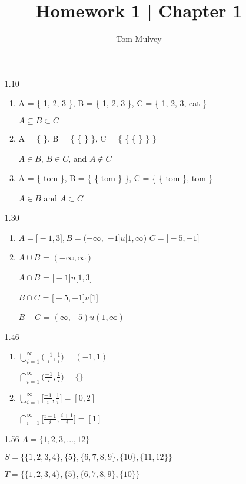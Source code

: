 \documentclass[12pt]{article}
\begin{document}
\title{Homework 1 | Chapter 1}
\author{Tom Mulvey}

\maketitle

\begin{enumerate}

\item[1.10]
\begin{enumerate}
\item
   A = \{ 1, 2, 3 \}, B = \{ 1, 2, 3 \}, C = \{ 1, 2, 3, cat \}
   
   $A\subseteq B\subset C$
\item
   A = \{ \}, B = \{ \{ \} \}, C = \{ \{ \{ \} \} \}
   
   $A\in B$, $B\in C$, and $A\notin C$
\item
   A = \{ tom \}, B = \{ \{ tom \} \}, C = \{ \{ tom \}, tom  \}

   $A\in B$ and $A\subset C$
\end{enumerate}

\item[1.30]
\begin{enumerate}
\item
   $A = \big[ -1, 3 \big], B = ( -{\infty}, $ $-1 \big]u\big[1, \infty )$ $C = \big[ -5, -1 \big] $

\item
   $A\cup B$ = $( -\infty, \infty )$

   $A\cap B$ = $\big[ -1 \big]u\big[ 1, 3 \big]$

   $B\cap C$ = $\big[ -5, -1 \big]u\big[ 1 \big]$

   $B - C$ = $(\infty,-5)u(1,\infty)$
\end{enumerate}

\item[1.46]
\begin{enumerate}
\item
   $\bigcup_{i=1}^{\infty} \bigg(\frac{-1}{i}, \frac{1}{i}\bigg) = (-1, 1)$
   
   $\bigcap_{i=1}^{\infty} \bigg(\frac{-1}{i}, \frac{1}{i}\bigg) = \{\}$
\item
   $\bigcup_{i=1}^{\infty} \bigg[\frac{-1}{i}, \frac{1}{i}\bigg] = [0,2]$
   
   $\bigcap_{i=1}^{\infty} \bigg[\frac{i-1}{i}, \frac{i+1}{i}\bigg] = [1]$
\end{enumerate}

\item[1.56]
   $A = \{1,2,3,...,12\}$
   
   $S = \{ \{1,2,3,4\}, \{5\}, \{6,7,8,9\}, \{10\}, \{11,12\}  \}$

   $T = \{ \{1,2,3,4\}, \{5\}, \{6,7,8,9\}, \{10\}  \}$
\end{enumerate}
\end{document}
